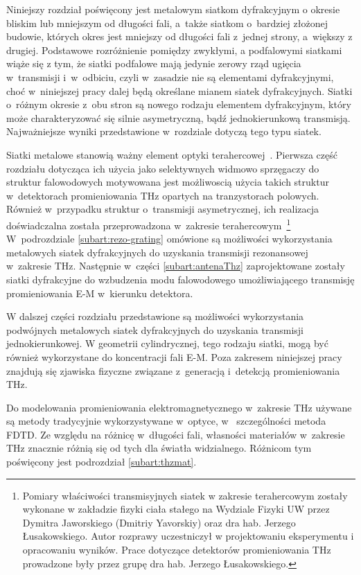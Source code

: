 Niniejszy rozdział poświęcony jest metalowym siatkom dyfrakcyjnym o okresie bliskim lub mniejszym od długości fali, a~także siatkom o~bardziej złożonej budowie, których okres jest mniejszy od długości fali z~jednej strony, a~większy z drugiej. Podstawowe rozróżnienie pomiędzy zwykłymi, a podfalowymi siatkami wiąże się z tym, że siatki podfalowe mają jedynie zerowy rząd ugięcia w~transmisji i~w~odbiciu, czyli w~zasadzie nie są elementami dyfrakcyjnymi, choć w~niniejszej pracy dalej będą określane mianem siatek dyfrakcyjnych. Siatki o~różnym okresie z~obu stron są nowego rodzaju elementem dyfrakcyjnym, który może charakteryzować się silnie asymetryczną, bądź jednokierunkową transmisją. Najważniejsze wyniki przedstawione w~rozdziale dotyczą tego typu siatek.

Siatki metalowe stanowią ważny element optyki terahercowej~\cite{zhang2010introduction}. Pierwsza część rozdziału dotycząca ich użycia jako selektywnych widmowo sprzęgaczy do struktur falowodowych motywowana jest możliwoscią użycia takich struktur w~detektorach promieniowania THz opartych na tranzystorach polowych. Również w~przypadku struktur o~transmisji asymetrycznej, ich realizacja doświadczalna została przeprowadzona w~zakresie terahercowym~\footnote{Pomiary właściwości transmisyjnych siatek w zakresie terahercowym zostały wykonane w zakładzie fizyki ciała stałego na Wydziale Fizyki UW przez Dymitra Jaworskiego (Dmitriy Yavorskiy) oraz dra hab. Jerzego Łusakowskiego. Autor rozprawy uczestniczył w projektowaniu eksperymentu i opracowaniu wyników. Prace dotyczące detektorów promieniowania THz prowadzone były przez grupę dra hab. Jerzego Łusakowskiego.} W~podrozdziale \ref{subart:rezo-grating} omówione są możliwości wykorzystania metalowych siatek dyfrakcyjnych do uzyskania transmisji rezonansowej w~zakresie THz. Następnie w~części \ref{subart:antenaThz} zaprojektowane zostały siatki dyfrakcyjne do wzbudzenia modu falowodowego umożliwiającego transmisję promieniowania E-M w~kierunku detektora.

W dalszej części rozdziału przedstawione są możliwości wykorzystania podwójnych metalowych siatek dyfrakcyjnych do uzyskania transmisji jednokierunkowej. W geometrii cylindrycznej, tego rodzaju siatki, mogą być również wykorzystane do koncentracji fali E-M. Poza zakresem niniejszej pracy znajdują się zjawiska fizyczne związane z~generacją i~detekcją promieniowania THz.

Do modelowania promieniowania elektromagnetycznego w~zakresie THz używane są metody tradycyjnie wykorzystywane w~optyce, w~ szczególności metoda FDTD. Ze względu na różnicę w~długości fali, własności materiałów w~zakresie THz znacznie różnią się od tych dla światła widzialnego. Różnicom tym poświęcony jest podrozdział \ref{subart:thzmat}.
